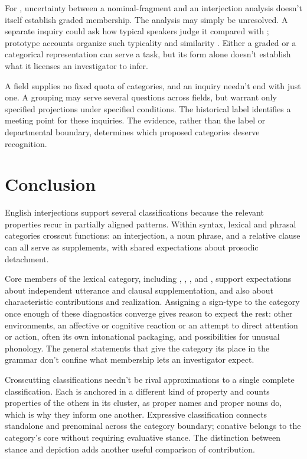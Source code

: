 \documentclass[12pt]{article}
\begin{document}
For , uncertainty between a nominal-fragment and an
interjection analysis doesn't itself establish graded membership. The
analysis may simply be unresolved. A separate inquiry could ask how
typical speakers judge it compared with ; prototype
accounts organize such typicality and similarity \citep{rosch1975,taylor2003}.
Either a graded or a categorical representation can serve a task,
but its form alone doesn't establish what it licenses an investigator
to infer.

A field supplies no fixed quota of categories, and an inquiry
needn't end with just one. A grouping may serve several questions across
fields, but warrant only specified projections under specified conditions.
The historical label  identifies a meeting point for
these inquiries. The evidence, rather than the label or departmental
boundary, determines which proposed categories deserve recognition.

\section{Conclusion}\label{sec:conclusion}

English interjections support several classifications because the relevant
properties recur in partially aligned patterns. Within syntax, lexical
and phrasal categories crosscut functions: an interjection, a noun phrase,
and a relative clause can all serve as supplements, with shared
expectations about prosodic detachment.

Core members of the lexical category, including ,
, , and , support expectations
about independent utterance and clausal supplementation, and also about
characteristic contributions and realization. Assigning a sign-type to the
category once enough of these diagnostics converge gives reason to expect
the rest: other environments, an affective or cognitive reaction
or an attempt to direct attention or action, often its own intonational
packaging, and possibilities for unusual phonology.
The general statements that give the category its place in the grammar
don't confine what membership lets an investigator expect.

Crosscutting classifications needn't be rival approximations to a single
complete classification. Each is anchored in a different kind of
property and counts properties of the others in its cluster, as proper
names and proper nouns do, which is why they inform one another. Expressive classification connects standalone and
prenominal  across the category boundary; conative
 belongs to the category's core without requiring evaluative
stance. The distinction between stance and depiction adds another
useful comparison of contribution.
\end{document}
